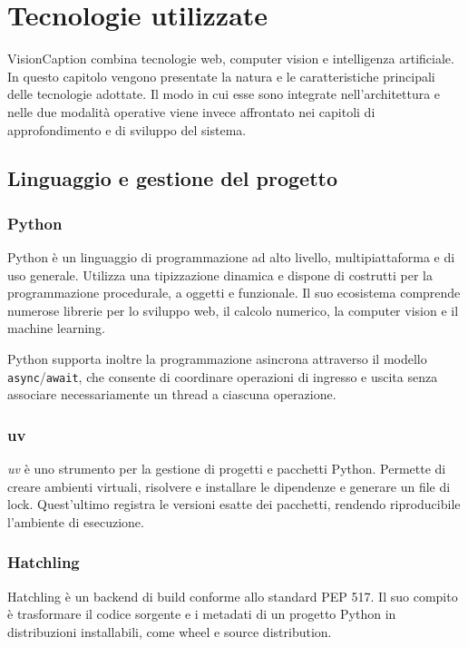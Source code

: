 \chapter{Tecnologie utilizzate}
\label{cap:tecnologie}

VisionCaption combina tecnologie web, computer vision e intelligenza
artificiale. In questo capitolo vengono presentate la natura e le
caratteristiche principali delle tecnologie adottate. Il modo in cui esse sono
integrate nell'architettura e nelle due modalità operative viene invece
affrontato nei capitoli di approfondimento e di sviluppo del sistema.

\section{Linguaggio e gestione del progetto}

\subsection{Python}
Python è un linguaggio di programmazione ad alto livello, multipiattaforma e di
uso generale. Utilizza una tipizzazione dinamica e dispone di costrutti per la
programmazione procedurale, a oggetti e funzionale. Il suo ecosistema comprende
numerose librerie per lo sviluppo web, il calcolo numerico, la computer vision
e il machine learning.

Python supporta inoltre la programmazione asincrona attraverso il modello
\texttt{async}/\texttt{await}, che consente di coordinare operazioni di
ingresso e uscita senza associare necessariamente un thread a ciascuna
operazione.

\subsection{uv}
\textit{uv} è uno strumento per la gestione di progetti e pacchetti Python.
Permette di creare ambienti virtuali, risolvere e installare le dipendenze e
generare un file di lock. Quest'ultimo registra le versioni esatte dei
pacchetti, rendendo riproducibile l'ambiente di esecuzione.

\subsection{Hatchling}
Hatchling è un backend di build conforme allo standard PEP 517. Il suo compito
è trasformare il codice sorgente e i metadati di un progetto Python in
distribuzioni installabili, come wheel e source distribution.

